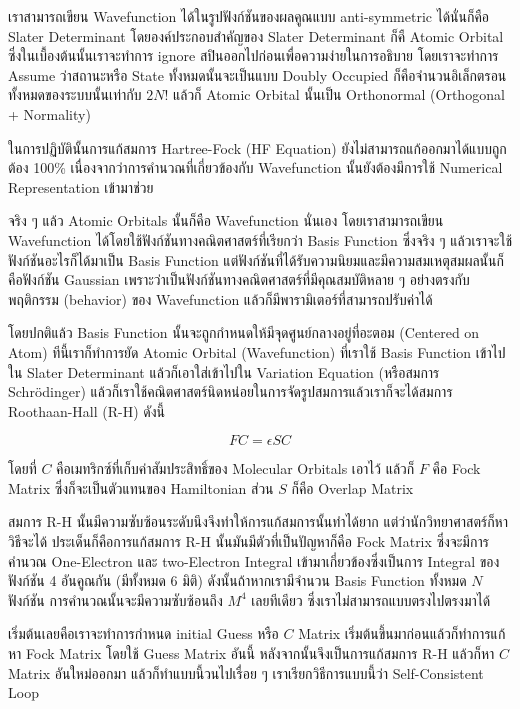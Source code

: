 เราสามารถเขียน Wavefunction ได้ในรูปฟังก์ชันของผลคูณแบบ anti-symmetric ได้นั่นก็คือ Slater Determinant
โดยองค์ประกอบสำคัญของ Slater Determinant ก็คื Atomic Orbital ซึ่งในเบื้องต้นนั้นเราจะทำการ ignore
สปินออกไปก่อนเพื่อความง่ายในการอธิบาย โดยเราจะทำการ Assume ว่าสถานะหรือ State ทั้งหมดนั้นจะเป็นแบบ
Doubly Occupied ก็คือจำนวนอิเล็กตรอนทั้งหมดของระบบนั้นเท่ากับ $2N!$ แล้วก็ Atomic Orbital
นั้นเป็น Orthonormal (Orthogonal + Normality)

ในการปฏิบัตินั้นการแก้สมการ Hartree-Fock (HF Equation) ยังไม่สามารถแก้ออกมาได้แบบถูกต้อง 100\%
เนื่องจากว่าการคำนวณที่เกี่ยวข้องกับ Wavefunction นั้นยังต้องมีการใช้ Numerical Representation เข้ามาช่วย

จริง ๆ แล้ว Atomic Orbitals นั้นก็คือ Wavefunction นั่นเอง โดยเราสามารถเขียน Wavefunction
ได้โดยใช้ฟังก์ชันทางคณิตศาสตร์ที่เรียกว่า Basis Function ซึ่งจริง ๆ แล้วเราจะใช้ฟังก์ชันอะไรก็ได้มาเป็น
Basis Function แต่ฟังก์ชันที่ได้รับความนิยมและมีความสมเหตุสมผลนั้นก็คือฟังก์ชัน Gaussian
เพราะว่าเป็นฟังก์ชันทางคณิตศาสตร์ที่มีคุณสมบัติหลาย ๆ อย่างตรงกับพฤติกรรม (behavior) ของ Wavefunction
แล้วก็มีพารามิเตอร์ที่สามารถปรับค่าได้

โดยปกติแล้ว Basis Function นั้นจะถูกกำหนดให้มีจุดศูนย์กลางอยู่ที่อะตอม (Centered on Atom)
ทีนี้เราก็ทำการยัด Atomic Orbital (Wavefunction) ที่เราใช้ Basis Function เข้าไปใน Slater
Determinant แล้วก็เอาใส่เข้าไปใน Variation Equation (หรือสมการ Schr\"{o}dinger)
แล้วก็เราใช้คณิตศาสตร์นิดหน่อยในการจัดรูปสมการแล้วเราก็จะได้สมการ Roothaan-Hall (R-H) ดังนี้

\begin{equation}
    FC = \epsilon SC
\end{equation}

โดยที่ $C$ คือเมทริกซ์ที่เก็บค่าสัมประสิทธิ์ของ Molecular Orbitals เอาไว้ แล้วก็ $F$ คือ Fock Matrix
ซึ่งก็จะเป็นตัวแทนของ Hamiltonian ส่วน $S$ ก็คือ Overlap Matrix

สมการ R-H นั้นมีความซับซ้อนระดับนึงจึงทำให้การแก้สมการนั้นทำได้ยาก แต่ว่านักวิทยาศาสตร์ก็หาวิธีจะได้
ประเด็นก็คือการแก้สมการ R-H นั้นมันมีตัวที่เป็นปัญหาก็คือ Fock Matrix ซึ่งจะมีการคำนวณ One-Electron
และ two-Electron Integral เข้ามาเกี่ยวข้องซึ่งเป็นการ Integral ของฟังก์ชัน 4 อันคูณกัน
(มีทั้งหมด 6 มิติ) ดังนั้นถ้าหากเรามีจำนวน Basis Function ทั้งหมด $N$ ฟังก์ชัน
การคำนวณนั้นจะมีความซับซ้อนถึง $M^{4}$ เลยทีเดียว ซึ่งเราไม่สามารถแบบตรงไปตรงมาได้

เริ่มต้นเลยคือเราจะทำการกำหนด initial Guess หรือ $C$ Matrix เริ่มต้นขึ้นมาก่อนแล้วก็ทำการแก้หา
Fock Matrix โดยใช้ Guess Matrix อันนี้ หลังจากนั้นจึงเป็นการแก้สมการ R-H แล้วก็หา $C$ Matrix
อันใหม่ออกมา แล้วก็ทำแบบนี้วนไปเรื่อย ๆ เราเรียกวิธีการแบบนี้ว่า Self-Consistent Loop


